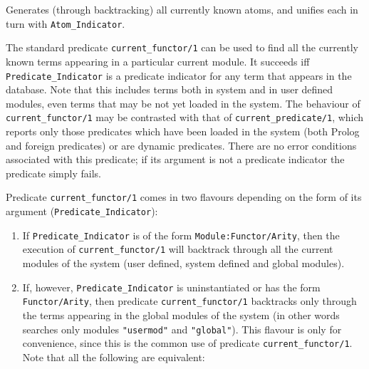 \begin{description}
    Generates (through backtracking) all currently known atoms, and unifies
    each in turn with {\tt Atom\_Indicator}. 


    The standard predicate {\tt current\_functor/1} can be used to find all
    the currently known terms appearing in a particular current module. 
    It succeeds iff {\tt Predicate\_Indicator} is a predicate 
    indicator for any term that appears in the database. Note that 
    this includes terms both in system and in user defined modules, even 
    terms that may be not yet loaded in the system. The behaviour of
    {\tt current\_functor/1} may be contrasted with that of
    {\tt current\_predicate/1}, which reports only those predicates which 
    have been loaded in the system (both Prolog and foreign predicates) or
    are dynamic predicates.
    There are no error conditions associated with this predicate; if its 
    argument is not a predicate indicator the predicate simply fails.

    Predicate {\tt current\_functor/1} comes in two flavours depending on 
    the form of its argument ({\tt Predicate\_Indicator}):
    \begin{enumerate}
    \item If {\tt Predicate\_Indicator} is of the form 
	  {\tt Module:Functor/Arity}, then the execution of
	  {\tt current\_functor/1} will backtrack through all
	  the current modules of the system (user defined, system
	  defined and global modules). 
    \item If, however, {\tt Predicate\_Indicator} is uninstantiated 
	  or has the form {\tt Functor/Arity}, then predicate 
	  {\tt current\_functor/1} backtracks only through the terms appearing 
	  in the global modules of the system (in other words searches only 
	  modules {\tt "usermod"} and {\tt "global"}). This flavour is only 
	  for convenience, since this is the common use of predicate 
	  {\tt current\_functor/1}. Note that all the following are equivalent:


\end{enumerate}
\end{description}
